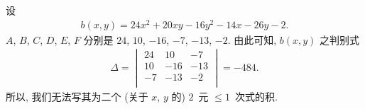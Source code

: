 \begin{example}
    设
    \begin{align*}
        b(x, y) = 24x^2 + 20xy - 16y^2 - 14x - 26y - 2.
    \end{align*}
    \(A\), \(B\), \(C\), \(D\), \(E\), \(F\)
    分别是
    \(24\), \(10\), \(-16\), \(-7\), \(-13\), \(-2\).
    由此可知, \(b(x, y)\) 之判别式
    \begin{align*}
        \Delta
        = \begin{vmatrix}
              24 & 10  & -7  \\
              10 & -16 & -13 \\
              -7 & -13 & -2  \\
          \end{vmatrix}
        = -484.
    \end{align*}
    所以, 我们无法写其为二个
    (关于 \(x\), \(y\) 的)
    \(2\)~元 \({\leq} 1\)~次式的积.
\end{example}

